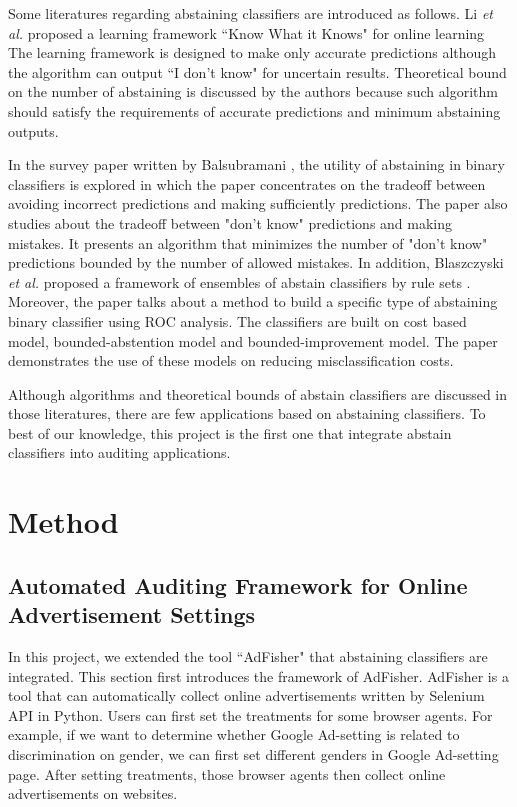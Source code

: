 \documentclass[12pt, journal]{IEEEtran}
\begin{document}
Some literatures regarding abstaining classifiers are introduced as follows.
Li \textit{et al.} proposed a learning framework ``Know What it Knows" \cite{KWIK} for online learning
The learning framework is designed to make only accurate predictions although the algorithm can output ``I don't know" for uncertain results.
Theoretical bound on the number of abstaining is discussed by the authors because such algorithm should satisfy the requirements of accurate predictions and minimum abstaining outputs. 


In the survey paper written by Balsubramani \cite{akshay}, the utility of abstaining in binary classifiers is explored in which the paper concentrates on the tradeoff between avoiding incorrect predictions and making sufficiently predictions. 
The paper  \cite{sayedi2010trading} also studies about the tradeoff between "don't know" predictions and making mistakes. It presents an algorithm that minimizes the number of "don't know" predictions bounded by the number of allowed mistakes. 
In addition, Blaszczyski \textit{et al.} proposed a framework of ensembles of abstain classifiers by rule sets \cite{blaszczynski2009ensembles}. 
Moreover, the paper \cite{pietraszek2005optimizing} talks about a method to build a specific type of abstaining binary classifier using ROC analysis. The classifiers are built on cost based model, bounded-abstention model and bounded-improvement model. The paper demonstrates the use of these models on reducing misclassification costs.

Although algorithms and theoretical bounds of abstain classifiers are discussed in those literatures,  there are few applications based on abstaining classifiers.
To best of our knowledge, this project is the first one that integrate abstain classifiers into auditing applications.



\section{Method}
\subsection{Automated Auditing Framework for Online Advertisement Settings}
In this project, we extended the tool ``AdFisher" that abstaining classifiers are integrated. This section first introduces the framework of AdFisher.  
AdFisher is a tool that can automatically collect online advertisements written by Selenium API \cite{selenium} in Python.
Users can first set the treatments for some browser agents.
For example, if we want to determine whether Google Ad-setting is related to discrimination on gender, we can first set different genders in Google Ad-setting page.
After setting treatments, those browser agents then collect online advertisements on websites.
\end{document}
